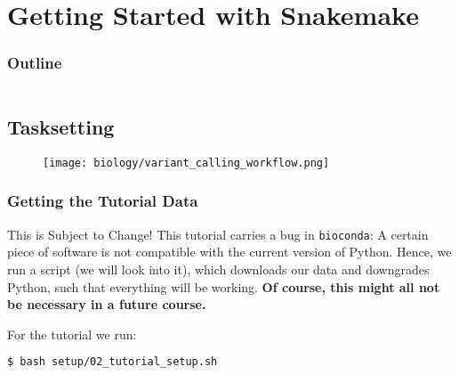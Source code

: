 \section{Getting Started with Snakemake}

\begin{frame}
    \frametitle{Outline}
    \begin{columns}[t]
        \begin{column}{.5\textwidth}
            \tableofcontents[sections={1-9},currentsection]
        \end{column}
        \begin{column}{.5\textwidth}
            \tableofcontents[sections={10-18},currentsection]
        \end{column}
    \end{columns}
\end{frame}

\subsection{Tasksetting}

\begin{frame}
  \begin{figure}
    \centering
    \texttt{[image: biology/variant\_calling\_workflow.png]}
  \end{figure}
\end{frame}

\begin{frame}[fragile]
  \frametitle{Getting the Tutorial Data}
  \begin{alertblock}{This is Subject to Change!}
   This tutorial carries a bug in \texttt{bioconda}: A certain piece of software is not compatible
   with the current version of Python. Hence, we run a script (we will look into it), which downloads
   our data and downgrades Python, such that everything will be working.\newline
   \textbf{Of course, this might all not be necessary in a future course.}
  \end{alertblock}
  \pause
  For the tutorial we run:
  \begin{lstlisting}[language=Bash, style=Shell]
$ bash setup/02_tutorial_setup.sh
  \end{lstlisting}
\end{frame}

